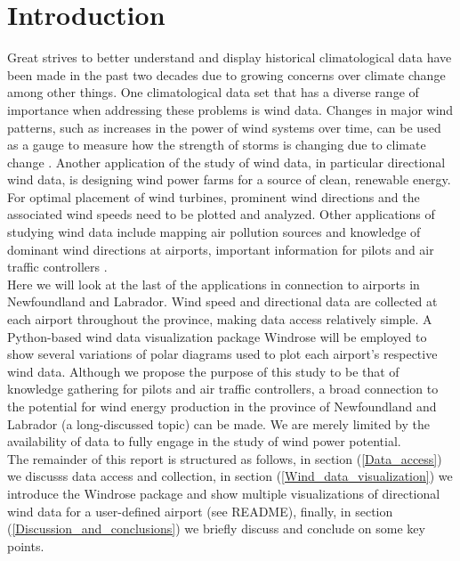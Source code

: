 \documentclass{article}
\begin{document}
\section{Introduction}\label{Introduction}
Great strives to better understand and display historical climatological data have been made in the past two decades due to growing concerns over climate change among other things. One climatological 
data set that has a diverse range of importance when addressing these problems is wind data. Changes in major wind patterns, such as increases in the power of wind systems over time, can be used as a gauge to 
measure how the strength of storms is changing due to climate change \cite{Mendelsohn2012}. Another application of the study of wind data, in particular directional wind data, is designing wind power 
farms \cite{CETINAY201751} for a source of clean, renewable energy. For optimal placement of wind turbines, prominent wind directions and the associated wind speeds need to be plotted and 
analyzed. Other applications of studying wind data include mapping air pollution sources \cite{ADAMS2016133} and knowledge of dominant wind directions at airports, important information for 
pilots and air traffic controllers \cite{jairm26}.
\\
\indent Here we will look at the last of the applications in connection to airports in Newfoundland and Labrador. Wind speed and directional data are collected at each airport throughout the province, 
making data access relatively simple. A Python-based wind data visualization package Windrose \cite{Roubeyrie2018} will be employed to show several variations of polar diagrams used to plot each 
airport's respective wind data. Although we propose the purpose of this study to be that of knowledge gathering for pilots and air traffic controllers, a broad connection to the potential for wind 
energy production in the province of Newfoundland and Labrador (a long-discussed topic) can be made. We are merely limited by the availability of data to fully engage in the study of wind power 
potential. 
\\
\indent The remainder of this report is structured as follows, in section (\ref{Data_access}) we discusss data access and collection, in section (\ref{Wind_data_visualization}) we introduce the Windrose  
package and show multiple visualizations of directional wind data for a user-defined airport (see README), finally, in section (\ref{Discussion_and_conclusions}) we briefly discuss and conclude on some 
key points.      
\end{document}
